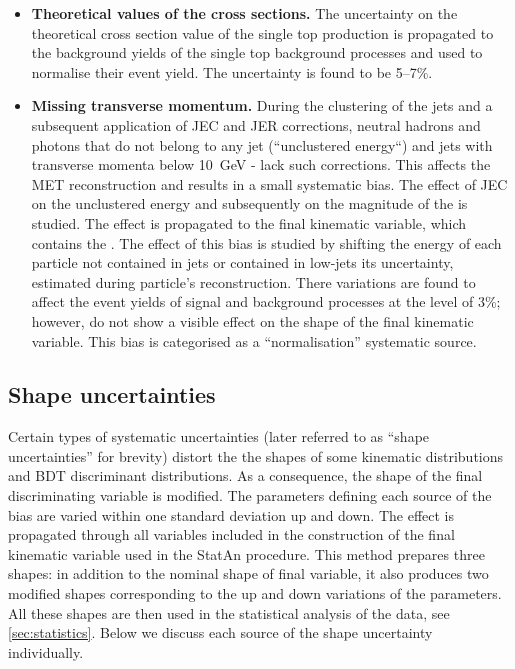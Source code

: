 \begin{itemize}
\item{\bf Theoretical values of the cross sections.} 
The uncertainty on the theoretical cross section value of the single top production is propagated to the background yields of the single top background processes and used to normalise their event yield. The uncertainty is found to be 5--7\%. 

\item{\bf Missing transverse momentum.} 
During the clustering of the jets and a subsequent application of JEC and JER corrections, 
neutral hadrons and photons that do not belong to any jet (``unclustered energy``) and jets with transverse momenta below 10~GeV - lack such corrections. This affects the MET reconstruction and results in a small systematic bias. The effect of JEC on the unclustered energy and subsequently on the magnitude of the \PTslash is studied. The effect is propagated to the final kinematic variable, which contains the \PTslash. The effect of this bias is studied by shifting the energy of each particle not contained in jets or contained in low-\pt jets its uncertainty, estimated during particle's reconstruction. There variations are found to affect the event yields of signal and background processes at the level of 3\%; however, do not show a visible effect on the shape of the final kinematic variable. This bias is categorised as a ``normalisation'' systematic source.

\end{itemize}

\subsection{Shape uncertainties}
\label{sec:shapes}

Certain types of systematic uncertainties (later referred to as ``shape uncertainties'' for brevity) distort the the shapes of some 
kinematic distributions and BDT discriminant distributions. As a consequence, the shape of the final discriminating variable is modified. The parameters defining each source of the bias are varied within one standard deviation up and down. The effect is propagated through all variables included in the construction of the final kinematic variable used in the StatAn procedure. This method prepares three shapes: in addition to the nominal shape of final variable, it also produces two modified shapes corresponding to the up and down variations of the parameters. All these shapes are then used in the statistical analysis of the data, see \ref{sec:statistics}. Below we discuss each source of the shape uncertainty  individually.

